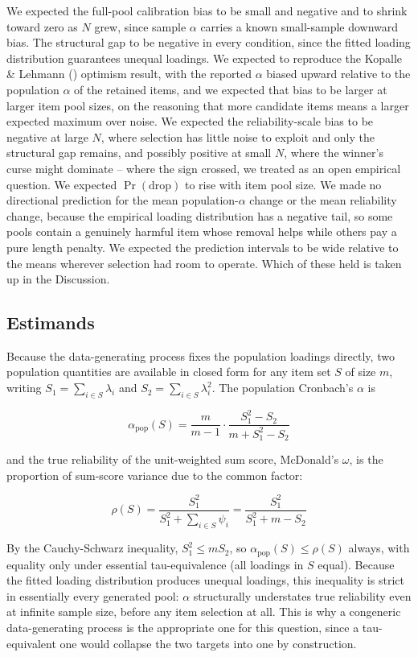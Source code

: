 \documentclass[
  nonatbib,
  authoryear,
  preprint]{elsarticle}
\begin{document}
We expected the full-pool calibration bias to be small and negative and
to shrink toward zero as \(N\) grew, since sample \(\alpha\) carries a
known small-sample downward bias. The structural gap to be negative in
every condition, since the fitted loading distribution guarantees
unequal loadings. We expected to reproduce the Kopalle \& Lehmann
() optimism result, with the
reported \(\alpha\) biased upward relative to the population \(\alpha\)
of the retained items, and we expected that bias to be larger at larger
item pool sizes, on the reasoning that more candidate items means a
larger expected maximum over noise. We expected the reliability-scale
bias to be negative at large \(N\), where selection has little noise to
exploit and only the structural gap remains, and possibly positive at
small \(N\), where the winner's curse might dominate -- where the sign
crossed, we treated as an open empirical question. We expected
\(\Pr(\text{drop})\) to rise with item pool size. We made no directional
prediction for the mean population-\(\alpha\) change or the mean
reliability change, because the empirical loading distribution has a
negative tail, so some pools contain a genuinely harmful item whose
removal helps while others pay a pure length penalty. We expected the
prediction intervals to be wide relative to the means wherever selection
had room to operate. Which of these held is taken up in the Discussion.

\subsection{Estimands}\label{estimands}

Because the data-generating process fixes the population loadings
directly, two population quantities are available in closed form for any
item set \(S\) of size \(m\), writing \(S_1 = \sum_{i \in S} \lambda_i\)
and \(S_2 = \sum_{i \in S} \lambda_i^2\). The population Cronbach's
\(\alpha\) is

\[\alpha_{\text{pop}}(S) = \frac{m}{m-1} \cdot \frac{S_1^2 - S_2}{m + S_1^2 - S_2}\]

and the true reliability of the unit-weighted sum score, McDonald's
\(\omega\), is the proportion of sum-score variance due to the common
factor:

\[\rho(S) = \frac{S_1^2}{S_1^2 + \sum_{i \in S} \psi_i} = \frac{S_1^2}{S_1^2 + m - S_2}\]

By the Cauchy-Schwarz inequality, \(S_1^2 \leq m S_2\), so
\(\alpha_{\text{pop}}(S) \leq \rho(S)\) always, with equality only under
essential tau-equivalence (all loadings in \(S\) equal). Because the
fitted loading distribution produces unequal loadings, this inequality
is strict in essentially every generated pool: \(\alpha\) structurally
understates true reliability even at infinite sample size, before any
item selection at all. This is why a congeneric data-generating process
is the appropriate one for this question, since a tau-equivalent one
would collapse the two targets into one by construction.
\end{document}
